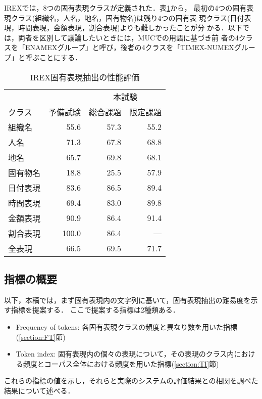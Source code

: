 IREXでは，8つの固有表現クラスが定義された．表\ref{table:F-measures}から，
最初の4つの固有表現クラス(組織名，人名，地名，固有物名)は残り4つの固有表
現クラス(日付表現，時間表現，金額表現，割合表現)よりも難しかったことが分
かる．以下では，両者を区別して議論したいときには，MUCでの用語に基づき前
者の4クラスを「ENAMEXグループ」と呼び，後者の4クラスを「TIMEX-NUMEXグルー
プ」と呼ぶことにする．

\begin{table}[t]\small
\caption{\label{table:F-measures}IREX固有表現抽出の性能評価}
\begin{center}
\begin{tabular}{|l||r|r|r|} \hline
         &          & \multicolumn{2}{|c|}{本試験}\\ \cline{3-4}
クラス   & 予備試験 & 総合課題 & 限定課題 \\ \hline \hline
組織名   &     55.6 & 57.3 & 55.2 \\ \hline
人名     &     71.3 & 67.8 & 68.8 \\ \hline
地名     &     65.7 & 69.8 & 68.1 \\ \hline
固有物名 &     18.8 & 25.5 & 57.9 \\ \hline
日付表現 &     83.6 & 86.5 & 89.4 \\ \hline
時間表現 &     69.4 & 83.0 & 89.8 \\ \hline
金額表現 &     90.9 & 86.4 & 91.4 \\ \hline
割合表現 &    100.0 & 86.4 &  --- \\ \hline \hline
全表現   &     66.5 & 69.5 & 71.7 \\ \hline
\end{tabular}
\end{center}
\end{table}

\subsection{指標の概要}

以下，本稿では，まず固有表現内の文字列に基いて，固有表現抽出の難易度を示す指標を提案する．
ここで提案する指標は2種類ある．
\begin{itemize}
 \item Frequency of tokens: 各固有表現クラスの頻度と異なり数を用いた指標(\ref{section:FT}節)
 \item Token index: 固有表現内の個々の表現について，その表現のクラス内における頻度とコーパス全体における頻度を用いた指標(\ref{section:TI}節)
\end{itemize}
これらの指標の値を示し，それらと実際のシステムの評価結果との相関を調べた結果について述べる．

